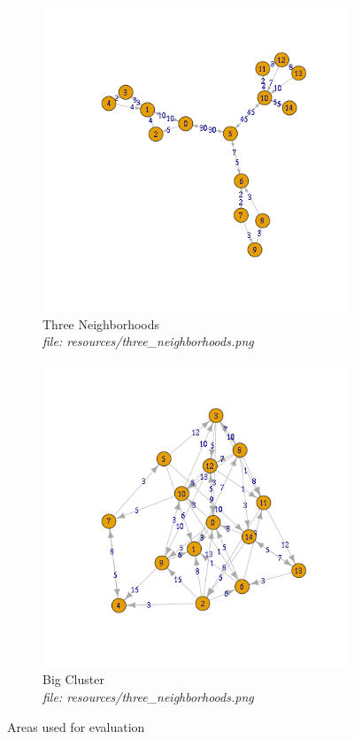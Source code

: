\documentclass{article}
\begin{document}
			\begin{figure}[H]
				\centering
				\begin{subfigure}[b]{.5\textwidth}
					\includegraphics[width=\textwidth]{resources/three_neighborhoods.png}
					\caption{Three Neighborhoods \\\textit{file: resources/three\_neighborhoods.png}}
					\label{fig:fig5a}
				\end{subfigure}\hfill%
				\begin{subfigure}[b]{.5\textwidth}
					\includegraphics[width=\textwidth]{resources/big_cluster.png}
					\caption{Big Cluster \\\textit{file: resources/three\_neighborhoods.png}}
					\label{fig:fig5b}
				\end{subfigure}
				\label{fig:fig5}
				\caption{Areas used for evaluation}
			\end{figure}
\end{document}
